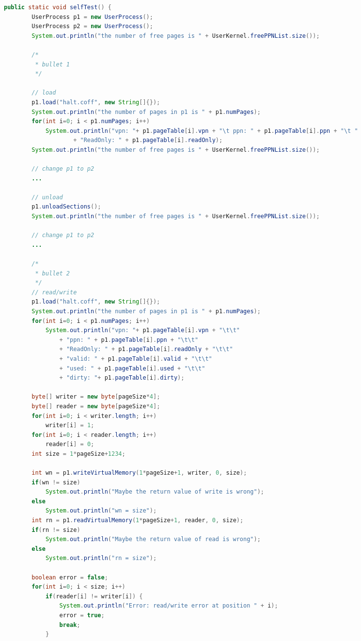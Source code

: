 \documentclass{article}
\begin{document}
\begin{spacing}{1.1}
\begin{lstlisting}[language=Java]
public static void selfTest() {
    	UserProcess p1 = new UserProcess();
    	UserProcess p2 = new UserProcess();
    	System.out.println("the number of free pages is " + UserKernel.freePPNList.size());

    	/*
    	 * bullet 1
    	 */
    	
    	// load
    	p1.load("halt.coff", new String[]{});
    	System.out.println("the number of pages in p1 is " + p1.numPages);
    	for(int i=0; i < p1.numPages; i++)
    		System.out.println("vpn: "+ p1.pageTable[i].vpn + "\t ppn: " + p1.pageTable[i].ppn + "\t "
    				+ "ReadOnly: " + p1.pageTable[i].readOnly);
    	System.out.println("the number of free pages is " + UserKernel.freePPNList.size());
    	
    	// change p1 to p2
    	...

    	// unload
    	p1.unloadSections();
    	System.out.println("the number of free pages is " + UserKernel.freePPNList.size());
    	
    	// change p1 to p2
    	...

    	/*
    	 * bullet 2
    	 */
    	// read/write
    	p1.load("halt.coff", new String[]{});
    	System.out.println("the number of pages in p1 is " + p1.numPages);
    	for(int i=0; i < p1.numPages; i++)
    		System.out.println("vpn: "+ p1.pageTable[i].vpn + "\t\t"
    			+ "ppn: " + p1.pageTable[i].ppn + "\t\t"
    			+ "ReadOnly: " + p1.pageTable[i].readOnly + "\t\t"
    			+ "valid: " + p1.pageTable[i].valid + "\t\t"
    			+ "used: " + p1.pageTable[i].used + "\t\t"
    			+ "dirty: "+ p1.pageTable[i].dirty);
    	
    	byte[] writer = new byte[pageSize*4];
    	byte[] reader = new byte[pageSize*4];
    	for(int i=0; i < writer.length; i++)
    		writer[i] = 1;
    	for(int i=0; i < reader.length; i++)
    		reader[i] = 0;
    	int size = 1*pageSize+1234;
    	
    	int wn = p1.writeVirtualMemory(1*pageSize+1, writer, 0, size);
    	if(wn != size)
    		System.out.println("Maybe the return value of write is wrong");
    	else
    		System.out.println("wn = size");
    	int rn = p1.readVirtualMemory(1*pageSize+1, reader, 0, size);
    	if(rn != size)
    		System.out.println("Maybe the return value of read is wrong");
    	else
    		System.out.println("rn = size");
    	
    	boolean error = false;
    	for(int i=0; i < size; i++)
    		if(reader[i] != writer[i]) {
    			System.out.println("Error: read/write error at position " + i);
    			error = true;
    			break;
    		}
    	

\end{lstlisting}
\end{spacing}
\end{document}

